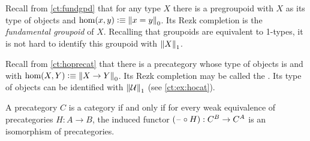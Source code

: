 \documentclass[hott-all.tex]{subfiles}
\begin{document}
\begin{eg}\label{ct:rezk-fundgpd-trunc1}
  Recall from \cref{ct:fundgpd} that for any type $X$ there is a pregroupoid with $X$ as its type of objects and $\hom(x,y) \defeq \pizero{x=y}$.
  Its Rezk completion is the \emph{fundamental groupoid} of $X$.
  Recalling that groupoids are equivalent to 1-types, it is not hard to identify this groupoid with $\trunc1X$.
\end{eg}

\begin{eg}\label{ct:hocat}
  Recall from \cref{ct:hoprecat} that there is a precategory whose type of objects is \type and with $\hom(X,Y) \defeq \pizero{X\to Y}$.
  Its Rezk completion may be called the .
  Its type of objects can be identified with $\trunc1\type$ (see \cref{ct:ex:hocat}).
\end{eg}


\begin{thm}\label{ct:weq-iso-precat-cat}
  A precategory $C$ is a category if and only if for every weak equivalence of precategories $H:A\to B$, the induced functor $(\blank\circ H):C^B \to C^A$ is an isomorphism of precategories.
\end{thm}
%
%
%
\end{document}
